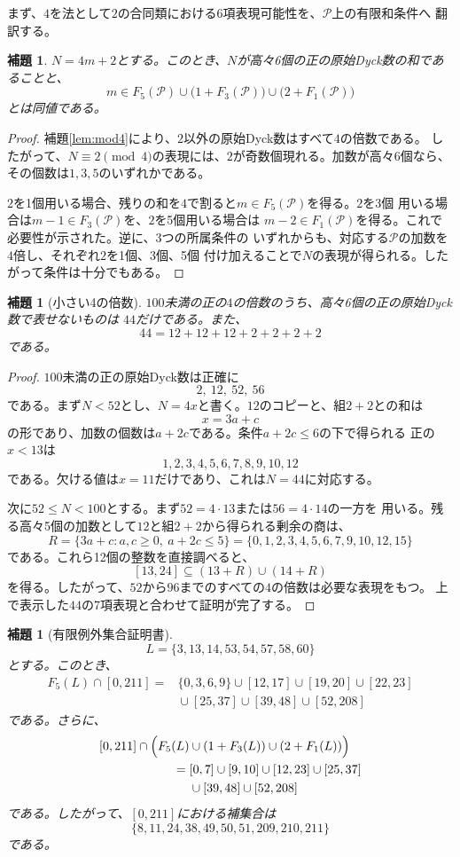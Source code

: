 \documentclass[12pt]{ltjsarticle}
\theoremstyle{plain}
\newtheorem{lemma}[theorem]{補題}
\newcommand{\Pset}{\mathcal P}
\begin{document}
まず、$4$を法として$2$の合同類における6項表現可能性を、$\Pset$上の有限和条件へ
翻訳する。

\begin{lemma}\label{lem:sixcriterion}
$N=4m+2$とする。このとき、$N$が高々6個の正の原始Dyck数の和であることと、
\[
 m\in F_5(\Pset)
 \cup\bigl(1+F_3(\Pset)\bigr)
 \cup\bigl(2+F_1(\Pset)\bigr)
\]
とは同値である。
\end{lemma}

\begin{proof}
補題\ref{lem:mod4}により、$2$以外の原始Dyck数はすべて$4$の倍数である。
したがって、$N\equiv2\pmod4$の表現には、$2$が奇数個現れる。加数が高々6個なら、
その個数は$1,3,5$のいずれかである。

$2$を1個用いる場合、残りの和を$4$で割ると$m\in F_5(\Pset)$を得る。$2$を3個
用いる場合は$m-1\in F_3(\Pset)$を、$2$を5個用いる場合は
$m-2\in F_1(\Pset)$を得る。これで必要性が示された。逆に、3つの所属条件の
いずれからも、対応する$\Pset$の加数を$4$倍し、それぞれ$2$を1個、3個、5個
付け加えることで$N$の表現が得られる。したがって条件は十分でもある。
\end{proof}

\begin{lemma}[小さい4の倍数]\label{lem:smallmultiples}
$100$未満の正の$4$の倍数のうち、高々6個の正の原始Dyck数で表せないものは
$44$だけである。また、
\[
 44=12+12+12+2+2+2+2
\]
である。
\end{lemma}

\begin{proof}
$100$未満の正の原始Dyck数は正確に
\[
 2,\ 12,\ 52,\ 56
\]
である。まず$N<52$とし、$N=4x$と書く。$12$のコピーと、組$2+2$との和は
\[
 x=3a+c
\]
の形であり、加数の個数は$a+2c$である。条件$a+2c\leq6$の下で得られる
正の$x<13$は
\[
 1,2,3,4,5,6,7,8,9,10,12
\]
である。欠ける値は$x=11$だけであり、これは$N=44$に対応する。

次に$52\leq N<100$とする。まず$52=4\cdot13$または$56=4\cdot14$の一方を
用いる。残る高々5個の加数として$12$と組$2+2$から得られる剰余の商は、
\[
 R=\{3a+c:a,c\geq0,\ a+2c\leq5\}
   =\{0,1,2,3,4,5,6,7,9,10,12,15\}
\]
である。これら12個の整数を直接調べると、
\[
 [13,24]\subseteq(13+R)\cup(14+R)
\]
を得る。したがって、$52$から$96$までのすべての$4$の倍数は必要な表現をもつ。
上で表示した$44$の7項表現と合わせて証明が完了する。
\end{proof}

\begin{lemma}[有限例外集合証明書]\label{lem:finiteexception}
\[
 L=\{3,13,14,53,54,57,58,60\}
\]
とする。このとき、
\[
\begin{aligned}
F_5(L)\cap[0,211]
={}&\{0,3,6,9\}\cup[12,17]\cup[19,20]\cup[22,23]\\
 &{}\cup[25,37]\cup[39,48]\cup[52,208]
\end{aligned}
\]
である。さらに、
\[
\begin{aligned}
[0,211]\cap\Bigl(F_5(L)&\cup(1+F_3(L))\cup(2+F_1(L))\Bigr)\\
={}&[0,7]\cup[9,10]\cup[12,23]\cup[25,37]\\
 &{}\cup[39,48]\cup[52,208]
\end{aligned}
\]
である。したがって、$[0,211]$における補集合は
\[
 \{8,11,24,38,49,50,51,209,210,211\}
\]
である。
\end{lemma}
\end{document}

